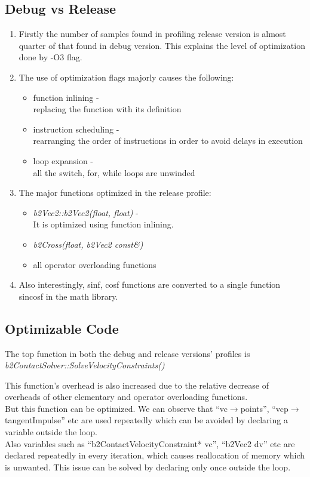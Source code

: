 \documentclass[11pt]{article}
\begin{document}
\subsection{Debug vs Release}
\begin{enumerate}
\item Firstly the number of samples found in profiling release version is almost quarter of that found in debug version. This explains the level of optimization done by -O3 flag.\\
\item The use of optimization flags majorly causes the following:
\begin{itemize}
\item function inlining - \\
 replacing the function with its definition 
\item instruction scheduling - \\
 rearranging the order of instructions in order to avoid delays in execution
\item loop expansion - \\
 all the switch, for, while loops are unwinded 
\end{itemize}
\item The major functions optimized in the release profile:
\begin{itemize}
\item \textit{b2Vec2::b2Vec2(float, float)} - \\
 It is optimized using function inlining.
\item \textit{b2Cross(float, b2Vec2 const\&)}
\item all operator overloading functions
\end{itemize}

\item Also interestingly, sinf, cosf functions are converted to a single function sincosf in the math library.\\
\end{enumerate}

\subsection{Optimizable Code}
The top function in both the debug and release versions' profiles is 
\textit{b2ContactSolver::SolveVelocityConstraints()}

This function's overhead is also increased due to the relative decrease of overheads of other elementary and operator overloading functions.\\
But this function can be optimized. We can observe that ``vc$\rightarrow$points'', ``vcp$\rightarrow$tangentImpulse'' etc are used repeatedly which can be avoided by declaring a variable outside the loop.\\
Also variables such as ``b2ContactVelocityConstraint* vc'', ``b2Vec2 dv'' etc are declared repeatedly in every iteration, which causes reallocation of memory which is unwanted. This issue can be solved by declaring only once outside the loop.
\end{document}

